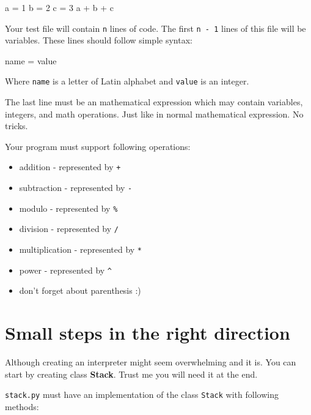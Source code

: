 \documentclass{42-en}
\begin{document}
\begin{42ccode}
a = 1
b = 2
c = 3
a + b + c
\end{42ccode}

    Your test file will contain \texttt{n} lines of code. The first \texttt{n - 1} lines
    of this file will be variables. These lines should follow simple syntax:
\begin{42ccode}
name = value
\end{42ccode}
    Where \texttt{name} is a letter of Latin alphabet and \texttt{value} is an integer.
    
    The last line must be an mathematical expression which may contain variables, integers, and math operations. Just like in normal mathematical expression. No tricks.
    
    Your program must support following operations:
    \begin{itemize}\itemsep1pt
        \item addition - represented by \texttt{+}
        \item subtraction - represented by \texttt{-}
        \item modulo - represented by \texttt{\%}
        \item division - represented by \texttt{/}
        \item multiplication - represented by \texttt{*}
        \item power - represented by \texttt{\^}
        \item don't forget about parenthesis :) 
    \end{itemize}


    \section{Small steps in the right direction}
    
    Although creating an interpreter might seem overwhelming and it is. You can start by creating class \textbf{Stack}. Trust me you will need it at the end.
    
    \texttt{stack.py} must have an implementation of the class \texttt{Stack}
    with following methods:
\end{document}
